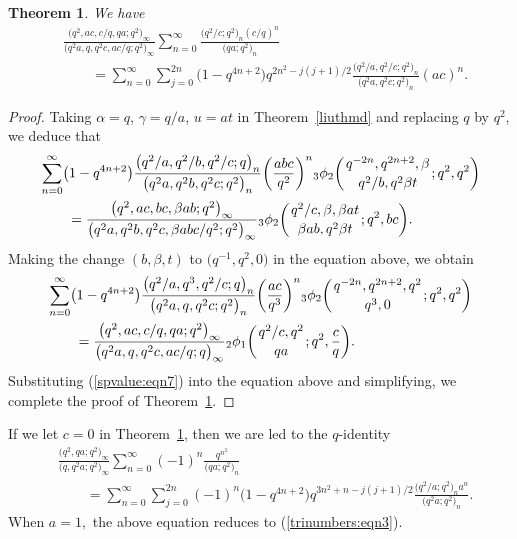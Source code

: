 \documentclass[pdftex]{sigma}
\numberwithin{equation}{section}
\newtheorem{Theorem}{Theorem}[section]
\begin{document}
\begin{Theorem}\label{Gaussthm} We have
\begin{align*} %
&\frac{\bigl(q^2, ac, c/q, qa; q^2\bigr)_\infty}{\bigl(q^2a, q, q^2c, ac/q; q^2\bigr)_\infty}
\sum_{n=0}^\infty \frac{\bigl(q^2/c; q^2\bigr)_n (c/q)^n}{\bigl(qa; q^2\bigr)_n}\\
&\qquad{}=\sum_{n=0}^\infty \sum_{j=0}^{2n} \bigl(1-q^{4n+2}\bigr) q^{2n^2-j(j+1)/2}
\frac{\bigl(q^2/a, q^2/c; q^2\bigr)_n}{\bigl(q^2a, q^2c; q^2\bigr)_n} (ac)^n.\nonumber
\end{align*}	
\end{Theorem}
\begin{proof}
Taking $\alpha=q$, $\gamma=q/a$, $u=at$ in Theorem~\ref{liuthmd} and replacing $q$ by $q^2$, we deduce that
 \begin{align*}%
 	&\sum_{n=0}^\infty\bigl(1-q^{4n+2}\bigr) \frac{\bigl(q^2/a, q^2/b, q^2/c; q\bigr)_n}{\bigl(q^2a, q^2b, q^2c; q^2\bigr)_n} \biggl(\frac{abc}{q^2}\biggr)^n {_3\phi_2}\biggl({{q^{-2n}, q^{2n+2}, \beta}\atop{q^2/b, q^2\beta t}}; q^2, q^2\biggr)\\
&\qquad{} 	=\frac{\bigl(q^2, ac, bc, \beta ab; q^2\bigr)_\infty}{\bigl(q^2a, q^2b, q^2c, \beta abc/q^2; q^2\bigr)_\infty}
 	{_3\phi_2}\biggl({{q^2/c, \beta, \beta at}\atop{\beta ab, q^2\beta t}}; q^2, bc\biggr).\nonumber
 \end{align*}	
 Making the change $(b, \beta, t)$ to $\bigl(q^{-1}, q^2, 0\bigr)$ in the equation above, we obtain
\begin{align*}%
	&\sum_{n=0}^\infty\bigl(1-q^{4n+2}\bigr) \frac{\bigl(q^2/a, q^3, q^2/c; q\bigr)_n}{\bigl(q^2a, q, q^2c; q^2\bigr)_n} \biggl(\frac{ac}{q^3}\biggr)^n {_3\phi_2}\biggl({{q^{-2n}, q^{2n+2}, q^2}\atop{q^3, 0}}; q^2, q^2\biggr)\\
&\qquad{}	=\frac{\bigl(q^2, ac, c/q, qa; q^2\bigr)_\infty}{\bigl(q^2a, q, q^2c, ac/q; q\bigr)_\infty}
	{_2\phi_1}\biggl({{q^2/c, q^2}\atop{qa}}; q^2, \frac{c}{q}\biggr). \nonumber
\end{align*}	
Substituting (\ref{spvalue:eqn7}) into the equation above and simplifying, we complete the proof of Theorem~\ref{Gaussthm}.
\end{proof}

If we let $c=0$ in Theorem~\ref{Gaussthm}, then we are led to the $q$-identity{\samepage
\begin{align}
&\frac{\bigl(q^2, qa; q^2\bigr)_\infty}{\bigl(q, q^2a; q^2\bigr)_\infty}
\sum_{n=0}^\infty (-1)^n\frac{q^{n^2}}{\bigl(qa; q^2\bigr)_n}\nonumber\\
&\qquad{}=\sum_{n=0}^\infty \sum_{j=0}^{2n} (-1)^n \bigl(1-q^{4n+2}\bigr) q^{3n^2+n-j(j+1)/2}
\frac{\bigl(q^2/a; q^2\bigr)_n a^n}{\bigl(q^2a; q^2\bigr)_n}.\label{Gauss:eqn3}
\end{align}
When $a=1,$ the above equation reduces to (\ref{trinumbers:eqn3}).}
\end{document}
